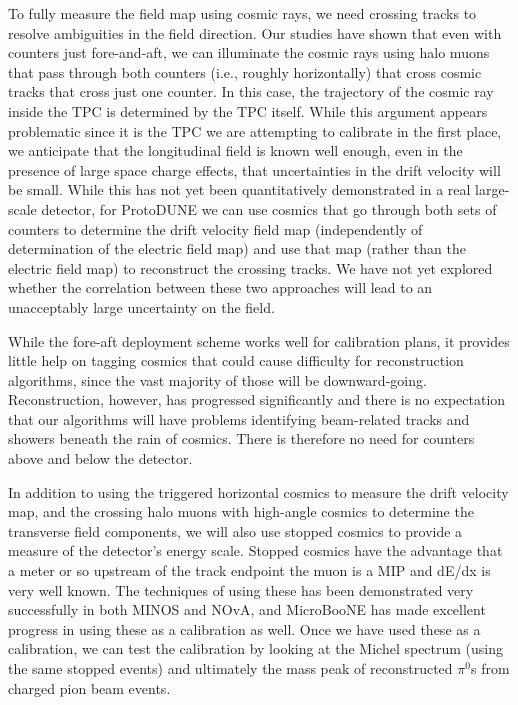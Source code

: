         To fully measure the field map using cosmic rays, we need crossing
tracks to resolve ambiguities in the field direction.  Our studies have shown
that even with counters just fore-and-aft, we can illuminate the cosmic rays
using halo muons that pass through both counters (i.e., roughly horizontally)
that cross cosmic tracks that cross just one counter. In this case, the
trajectory of the cosmic ray inside the TPC is determined by the TPC itself.
While this argument appears problematic since it is the TPC we are attempting
to calibrate in the first place, we anticipate that the longitudinal field is
known well enough, even in the presence of large space charge effects, that
uncertainties in the drift velocity will be small.  While this has not yet been
quantitatively demonstrated in a real large-scale detector, for ProtoDUNE we
can use cosmics that go through both sets of counters to determine the drift
velocity field map (independently of determination of the electric field map)
and use that map (rather than the electric field map) to reconstruct the
crossing tracks.  We have not yet explored whether the correlation between
these two approaches will lead to an unacceptably large uncertainty on the
field.

 While the fore-aft deployment scheme works well for calibration plans,
it provides little help on tagging cosmics that could cause difficulty for
reconstruction algorithms, since the vast majority of those will be
downward-going.  Reconstruction, however, has progressed significantly and
there is no expectation that our algorithms will have problems identifying
beam-related tracks and showers beneath the rain of cosmics. There is therefore
no need for counters above and below the detector.

        In addition to using the triggered horizontal cosmics to measure the
drift velocity map, and the crossing halo muons with high-angle cosmics to
determine the transverse field components, we will also use stopped cosmics to
provide a measure of the detector's energy scale. Stopped cosmics have the
advantage that a meter or so upstream of the track endpoint the muon is a MIP
and dE/dx is very well known. The techniques of using these has been
demonstrated very successfully in both MINOS and NOvA, and MicroBooNE has made
excellent progress in using these as a calibration as well. Once we have used
these as a calibration, we can test the calibration by looking at the Michel
spectrum (using the same stopped events) and ultimately the mass peak of
reconstructed $\pi^0$s from charged pion beam events.

